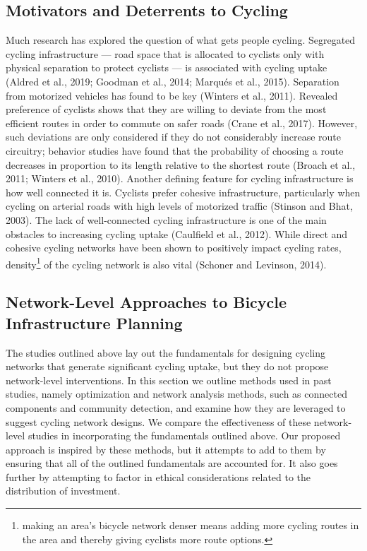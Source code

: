 \documentclass[
]{article}
\begin{document}
\hypertarget{motivators-and-deterrents-to-cycling}{%
\subsection{Motivators and Deterrents to Cycling}\label{motivators-and-deterrents-to-cycling}}

Much research has explored the question of what gets people cycling.
Segregated cycling infrastructure --- road space that is allocated to cyclists only with physical separation to protect cyclists --- is associated with cycling uptake (Aldred et al., 2019; Goodman et al., 2014; Marqués et al., 2015).
Separation from motorized vehicles has found to be key (Winters et al., 2011).
Revealed preference of cyclists shows that they are willing to deviate from the most efficient routes in order to commute on safer roads (Crane et al., 2017).
However, such deviations are only considered if they do not considerably increase route circuitry; behavior studies have found that the probability of choosing a route decreases in proportion to its length relative to the shortest route (Broach et al., 2011; Winters et al., 2010).
Another defining feature for cycling infrastructure is how well connected it is.
Cyclists prefer cohesive infrastructure, particularly when cycling on arterial roads with high levels of motorized traffic (Stinson and Bhat, 2003).
The lack of well-connected cycling infrastructure is one of the main obstacles to increasing cycling uptake (Caulfield et al., 2012).
While direct and cohesive cycling networks have been shown to positively impact cycling rates, density\footnote{making an area's bicycle network denser means adding more cycling routes in the area and thereby giving cyclists more route options.} of the cycling network is also vital (Schoner and Levinson, 2014).

\hypertarget{network-level-approaches-to-bicycle-infrastructure-planning}{%
\subsection{Network-Level Approaches to Bicycle Infrastructure Planning}\label{network-level-approaches-to-bicycle-infrastructure-planning}}

The studies outlined above lay out the fundamentals for designing cycling networks that generate significant cycling uptake, but they do not propose network-level interventions.
In this section we outline methods used in past studies, namely optimization and network analysis methods, such as connected components and community detection, and examine how they are leveraged to suggest cycling network designs.
We compare the effectiveness of these network-level studies in incorporating the fundamentals outlined above.
Our proposed approach is inspired by these methods, but it attempts to add to them by ensuring that all of the outlined fundamentals are accounted for.
It also goes further by attempting to factor in ethical considerations related to the distribution of investment.
\end{document}
